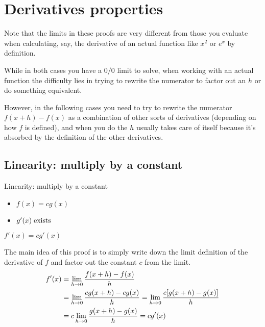 \section{Derivatives properties}

Note that the limits in these proofs are very different from those you evaluate when calculating, say, the derivative of an actual function like $x^2$ or $e^x$ by definition.

While in both cases you have a $0/0$ limit to solve, when working with an actual function the difficulty lies in trying to rewrite the numerator to factor out an $h$ or do something equivalent.

However, in the following cases you need to try to rewrite the numerator $f(x+h)-f(x)$ as a combination of other sorts of derivatives (depending on how $f$ is defined), and when you do the $h$ usually takes care of itself because it's absorbed by the definition of the other derivatives.

\subsection{Linearity: multiply by a constant}

\begin{property}{Linearity: multiply by a constant}
    \begin{precondition}
        \begin{itemize}
          \item $f(x)=cg(x)$
          \item $g'(x)  \; \text{exists} \;$
        \end{itemize}
      \end{precondition}
    \begin{claim}
        $f'(x)=c g'(x)$
    \end{claim}
    \begin{Proof}
      The main idea of this proof is to simply write down the limit definition of the derivative of $f$ and factor out the constant $c$ from the limit.
      \begin{align*}
      f'(x)&=\lim\limits_{h \rightarrow 0}  \frac{f(x+h)-f(x)}{h}
      \\&=\lim\limits_{h \rightarrow 0}  \frac{ c g(x+h) - c g(x)}{h}
      =\lim\limits_{h \rightarrow 0}  \frac{ c [g(x+h) -g(x)] }{h}
      \\&=c \lim\limits_{h \rightarrow 0}  \frac{  g(x+h) -g(x) }{h}
      =c g'(x)
      \end{align*}
    \end{Proof}
\end{property}


